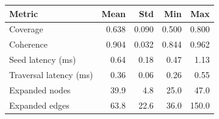 \begin{tabular}{lrrrr}
\toprule
Metric & Mean & Std & Min & Max \\
\midrule
Coverage & 0.638 & 0.090 & 0.500 & 0.800 \\
Coherence & 0.904 & 0.032 & 0.844 & 0.962 \\
Seed latency (ms) & 0.64 & 0.18 & 0.47 & 1.13 \\
Traversal latency (ms) & 0.36 & 0.06 & 0.26 & 0.55 \\
Expanded nodes & 39.9 & 4.8 & 25.0 & 47.0 \\
Expanded edges & 63.8 & 22.6 & 36.0 & 150.0 \\
\bottomrule
\end{tabular}
